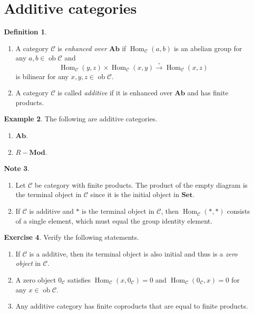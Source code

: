 \documentclass[10pt,letterpaper,cm]{nupset}
\theoremstyle{definition}
\newtheorem{definition}{Definition}[subsection]
\newtheorem{exmp}[definition]{Example}
\newtheorem{note}[definition]{Note}
\theoremstyle{theorem}
\newtheorem{exercise}[definition]{Exercise}
\theoremstyle{remark}
\newcommand{\1}{\mathbf{1}}
\renewcommand{\c}{\mathscr{C}}
\newcommand{\0}{\vec 0}
\DeclareMathOperator{\ob}{ob}
\DeclareMathOperator{\Hom}{Hom}
\begin{document}
\section{Additive categories}

\begin{definition} $ $
\begin{enumerate}
\item A category $\c$ is \textit{enhanced over $\mathbf{Ab}$} if $\Hom_{\c}(a, b)$ is an abelian group for any $a, b \in \ob{\c}$ and $$\Hom_{\c}(y, z) \times \Hom_{\c}(x,y) \overset{\circ}{\longrightarrow} \Hom_{\c}(x,z)$$ is bilinear for any $x,y,z\in \ob{\c}$.
\item A category $\c$ is called \textit{additive} if it is enhanced over $\mathbf{Ab}$ and has finite products. 
\end{enumerate}
\end{definition}

\begin{exmp} The following are additive categories. 
\begin{enumerate}
\item $\mathbf{Ab}$.
\item $R{-}\mathbf{Mod}$.
\end{enumerate}
\end{exmp}

\begin{note} $ $
\begin{enumerate}
\item Let $\c$ be category with finite products. The product of the empty diagram is the terminal object in $\c$ since it is the initial object in $\mathbf{Set}$.
\item If $\c$ is additive and $\ast$ is the terminal object in $\c$, then $\Hom_{\c}(\ast,\ast)$ consists of a single element, which must equal the group identity element.
\end{enumerate}
\end{note}

\begin{exercise} Verify the following statements.
\begin{enumerate}
\item If $\c$ is a additive, then its terminal object is also initial and thus is a \textit{zero object} in $\c$. 
\item A zero object $0_{\c}$ satisfies $\Hom_{\c}(x, 0_{\c}) =0$ and $\Hom_{\c}(0_{\c}, x) =0$ for any $x\in \ob{\c}$.
\item Any additive category has finite coproducts that are equal to finite products.
\end{enumerate}
\end{exercise}
\end{document}
